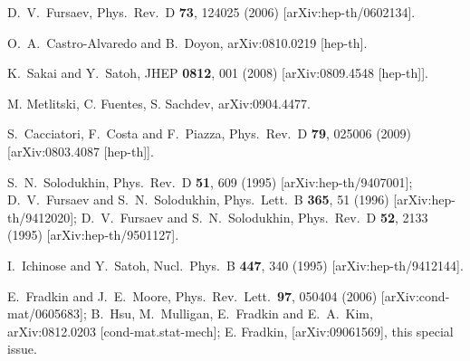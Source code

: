 \documentclass[a4paper]{article}
\begin{document}
\begin{thebibliography}{99}
D.~V.~Fursaev,
  Phys.\ Rev.\ D {\bf 73}, 124025 (2006)
  [arXiv:hep-th/0602134].
 

  O.~A.~Castro-Alvaredo and B.~Doyon,
  arXiv:0810.0219 [hep-th].


  K.~Sakai and Y.~Satoh,
  JHEP {\bf 0812}, 001 (2008)
  [arXiv:0809.4548 [hep-th]].

M. Metlitski, C. Fuentes, S. Sachdev, arXiv:0904.4477. 

  S.~Cacciatori, F.~Costa and F.~Piazza,
  Phys.\ Rev.\  D {\bf 79}, 025006 (2009)
  [arXiv:0803.4087 [hep-th]].



S.~N.~Solodukhin,
  Phys.\ Rev.\ D {\bf 51}, 609 (1995)
  [arXiv:hep-th/9407001]; 
  D.~V.~Fursaev and S.~N.~Solodukhin,
  Phys.\ Lett.\  B {\bf 365}, 51 (1996)
  [arXiv:hep-th/9412020];
  D.~V.~Fursaev and S.~N.~Solodukhin,
  Phys.\ Rev.\  D {\bf 52}, 2133 (1995)
  [arXiv:hep-th/9501127].

  I.~Ichinose and Y.~Satoh,
  Nucl.\ Phys.\  B {\bf 447}, 340 (1995)
  [arXiv:hep-th/9412144].



 
  E.~Fradkin and J.~E.~Moore,
  Phys.\ Rev.\ Lett.\  {\bf 97}, 050404 (2006)
  [arXiv:cond-mat/0605683]; 
  B.~Hsu, M.~Mulligan, E.~Fradkin and E.~A.~Kim,
  arXiv:0812.0203 [cond-mat.stat-mech];
 E. Fradkin, [arXiv:09061569], this special issue.


\end{thebibliography}
\end{document}
